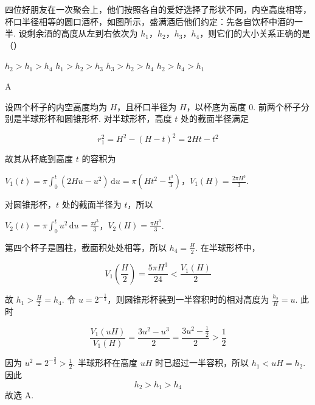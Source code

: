 \begin{problem}
四位好朋友在一次聚会上，他们按照各自的爱好选择了形状不同，内空高度相等，杯口半径相等的圆口酒杯，如图所示，盛满酒后他们约定：先各自饮杯中酒的一半. 设剩余酒的高度从左到右依次为 \(h_1\)，\(h_2\)，\(h_3\)，\(h_4\)，则它们的大小关系正确的是（\quad）


\choices
    {\(h_2 > h_1 > h_4\)}
    {\(h_1 > h_2 > h_3\)}
    {\(h_3 > h_2 > h_4\)}
    {\(h_2 > h_4 > h_1\)}

\begin{answer}
A
\end{answer}

\begin{solution}
设四个杯子的内空高度均为 \(H\)，且杯口半径为 \(H\)，以杯底为高度 \(0\). 前两个杯子分别是半球形杯和圆锥形杯. 对半球形杯，高度 \(t\) 处的截面半径满足

\[
r_1^2=H^2-(H-t)^2=2Ht-t^2
\]

故其从杯底到高度 \(t\) 的容积为

\(V_1(t)=\pi\int_0^t(2Hu-u^2)\,\mathrm du =\pi\left(Ht^2-\frac{t^3}{3}\right)\)，\(V_1(H)=\frac{2\pi H^3}{3}\).

对圆锥形杯，\(t\) 处的截面半径为 \(t\)，所以

\(V_2(t)=\pi\int_0^t u^2\,\mathrm du=\frac{\pi t^3}{3}\)，\(V_2(H)=\frac{\pi H^3}{3}\).

第四个杯子是圆柱，截面积处处相等，所以 \(h_4=\frac{H}{2}\). 在半球形杯中，

\[
V_1\left(\frac{H}{2}\right)=\frac{5\pi H^3}{24}<\frac{V_1(H)}{2}
\]

故 \(h_1>\frac{H}{2}=h_4\). 令 \(u=2^{-\frac{1}{3}}\)，则圆锥形杯装到一半容积时的相对高度为 \(\frac{h_2}{H}=u\). 此时

\[
\frac{V_1(uH)}{V_1(H)}=\frac{3u^2-u^3}{2}=\frac{3u^2-\frac12}{2}>\frac12
\]

因为 \(u^2=2^{-\frac{2}{3}}>\frac12\). 半球形杯在高度 \(uH\) 时已超过一半容积，所以 \(h_1<uH=h_2\). 因此
\[
h_2>h_1>h_4
\]
故选 A.
\end{solution}
\end{problem}

